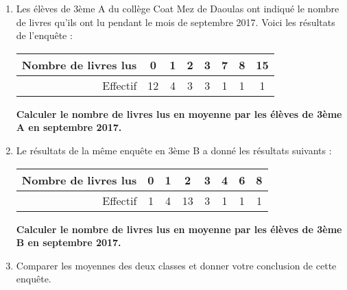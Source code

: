 \begin{minipage}{0.99\linewidth}

\exo



\begin{enumerate}

\item Les élèves de 3ème A du collège Coat Mez de Daoulas ont indiqué le nombre de livres qu'ils ont lu pendant le mois de septembre 2017. Voici les résultats de l'enquête :
\begin{center}

\begin{tabular}{|r|c|c|c|c|c|c|c|}
\hline 
Nombre de livres lus & 0 & 1 & 2 & 3 & 7 & 8 & 15 \\ 
\hline 
Effectif & 12 & 4 & 3 & 3 & 1 & 1 & 1 \\ 
\hline 
\end{tabular} 

\end{center}
\textbf{Calculer le nombre de livres lus en moyenne par les élèves de 3ème A en septembre 2017.}

\item Le résultats de la même enquête en 3ème B a donné les résultats suivants :

\begin{center}
 
\begin{tabular}{|r|c|c|c|c|c|c|c|}
\hline 
Nombre de livres lus & 0 & 1 & 2 & 3 & 4 & 6 & 8 \\ 
\hline 
Effectif & 1 & 4 & 13 & 3 & 1 & 1 & 1 \\ 
\hline
\end{tabular}
 \end{center} 

\textbf{Calculer le nombre de livres lus en moyenne par les élèves de 3ème B en septembre 2017.}


\item Comparer les moyennes des deux classes et donner votre conclusion de cette enquête.


\end{enumerate}


\end{minipage}

\vspace{0.5cm}
